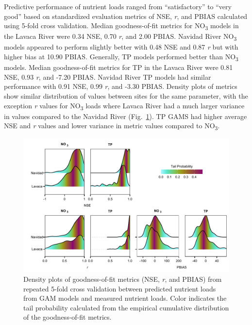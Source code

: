 \documentclass[fleqn,10pt,lineno]{wlpeerj} %
\providecommand{\DIFaddbeginFL}{} %
\providecommand{\DIFaddendFL}{} %
\providecommand{\DIFdelbeginFL}{} %
\providecommand{\DIFdelendFL}{} %
\begin{document}
Predictive performance of nutrient loads ranged from ``satisfactory'' to
``very good'' based on standardized evaluation metrics of NSE, \emph{r},
and PBIAS \autocite{moriasiHydrologicWaterQuality2015} calculated using
5-fold cross validation. Median goodness-of-fit metrics for
NO\textsubscript{3} models in the Lavaca River were 0.34 NSE, 0.70
\emph{r}, and 2.00 PBIAS. Navidad River NO\textsubscript{3} models
appeared to perform slightly better with 0.48 NSE and 0.87 \emph{r} but
with higher bias at 10.90 PBIAS. Generally, TP models performed better
than NO\textsubscript{3} models. Median goodness-of-fit metrics for TP
in the Lavaca River were 0.81 NSE, 0.93 \emph{r}, and -7.20 PBIAS.
Navidad River TP models had similar performance with 0.91 NSE, 0.99
\emph{r}, and -3.30 PBIAS. Density plots of metrics show similar
distribution of values between sites for the same parameter, with the
exception \emph{r} values for NO\textsubscript{3} loads where Lavaca
River had a much larger variance in values compared to the Navidad River
(Fig.~\ref{fig:fig2}). TP GAMS had higher average NSE and \emph{r}
values and lower variance in metric values compared to
NO\textsubscript{3}.

\begin{figure}

{\centering \DIFdelbeginFL %
\DIFdelendFL \DIFaddbeginFL \includegraphics[width=1\linewidth,]{Schramm-2023-08-PeerJ_files/figure-latex/fig2} 
\DIFaddendFL 

}

\caption{Density plots of goodness-of-fit metrics (NSE, \textit{r}, and PBIAS) from repeated 5-fold cross validation between predicted nutrient loads from GAM models and measured nutrient loads. Color indicates the tail probability calculated from the empirical cumulative distribution of the goodness-of-fit metrics.}\label{fig:fig2}
\end{figure}
\end{document}
